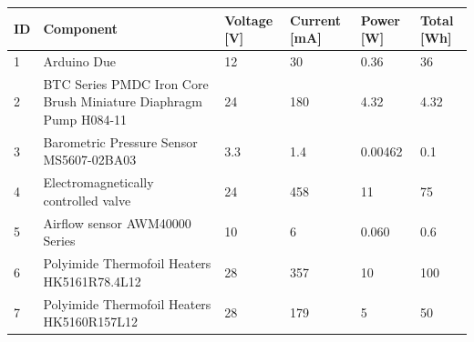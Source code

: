\documentclass[a4paper,12pt,twoside]{article}
\begin{document}
\begin{longtable}{|m{}| m{} |m{} |m{}|m{}| m{} |}
\hline
\textbf{ID}             & \textbf{Component}                                                   & \textbf{Voltage {[}V{]}} & \textbf{Current {[}mA{]}} & \textbf{Power {[}W{]}} & \textbf{Total {[}Wh{]}} \\ \hline
1                       & Arduino Due                                       & 12                                          & 30                                           & 0.36                                      & 36                                         \\ \hline
2                       & BTC Series PMDC Iron Core Brush Miniature Diaphragm Pump H084-11                         & 24                                          & 180                                         & 4.32                                      & 4.32                                       \\ \hline
3                       & Barometric Pressure Sensor MS5607-02BA03          & 3.3                                         & 1.4                                          & 0.00462                                   & 0.1                                        \\ \hline
4                       & Electromagnetically controlled valve              & 24                                          & 458                                          & 11                                        & 75                                         \\ \hline
5                       & Airflow sensor AWM40000 Series                    & 10                                          & 6                                            & 0.060                                     & 0.6                                        \\ \hline
6                       & Polyimide Thermofoil Heaters HK5161R78.4L12       & 28                                          & 357                                          & 10                                        & 100                                        \\ \hline
7                       & Polyimide Thermofoil Heaters HK5160R157L12        & 28                                          & 179                                          & 5                                         & 50                                         \\ \hline

\end{longtable}
\end{document}
